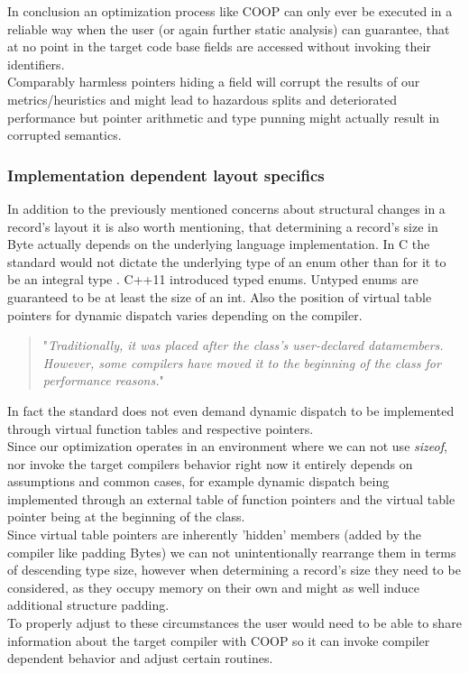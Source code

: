 In conclusion an optimization process like COOP can only ever be executed in a reliable way when the user (or again further static analysis) can guarantee, that at no point in the target code base fields are accessed without invoking their identifiers.\\
Comparably harmless pointers hiding a field will corrupt the results of our metrics/heuristics and might lead to hazardous splits and deteriorated performance but pointer arithmetic and type punning might actually result in corrupted semantics.

\subsubsection{Implementation dependent layout specifics}
In addition to the previously mentioned concerns about structural changes in a record's layout it is also worth mentioning, that determining a record's size in Byte actually depends on the underlying language implementation.
In C the standard would not dictate the underlying type of an enum other than for it to be an integral type . C++11 introduced typed enums. Untyped enums are guaranteed to be at least the size of an int. Also the position of virtual table pointers for dynamic dispatch varies depending on the compiler.
\begin{quote}
	"\textit{Traditionally, it was placed after the class's user-declared datamembers. However, some compilers have moved it to the beginning of the class for performance reasons.}" 
\end{quote}
In fact the standard does not even demand dynamic dispatch to be implemented through virtual function tables and respective pointers.\\
Since our optimization operates in an environment where we can not use \textit{sizeof}, nor invoke the target compilers behavior right now it entirely depends on assumptions and common cases, for example dynamic dispatch being implemented through an external table of function pointers and the virtual table pointer being at the beginning of the class.\\
Since virtual table pointers are inherently 'hidden' members (added by the compiler like padding Bytes) we can not unintentionally rearrange them in terms of descending type size, however when determining a record's size they need to be considered, as they occupy memory on their own and might as well induce additional structure padding.\\
To properly adjust to these circumstances the user would need to be able to share information about the target compiler with COOP so it can invoke compiler dependent behavior and adjust certain routines.

